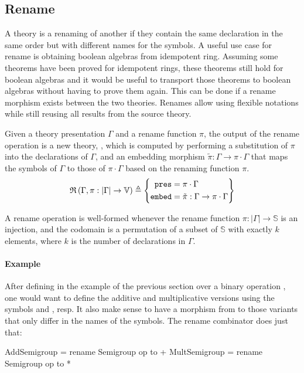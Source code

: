 \subsection{Rename}
\label{subsec:rename}
A theory is a renaming of another if they contain the same declaration in the same order but with different names for the symbols. A useful use case for rename is obtaining boolean algebras from idempotent ring. Assuming some theorems have been proved for idempotent rings, these theorems still hold for boolean algebras and it would be useful to transport those theorems to boolean algebras without having to prove them again. This can be done if a rename morphism exists between the two theories. Renames allow using flexible notations while still reusing all results from the source theory. 

Given a theory presentation $\Gamma$ and a rename function $\pi$, the output of the rename operation is a new theory, , which is computed by performing a substitution of $\pi$ into the declarations of $\Gamma$, and an embedding morphism $\tilde{\pi} : \Gamma \to \pi\cdot\Gamma$ that maps the symbols of $\Gamma$ to those of $\pi\cdot\Gamma$ based on the renaming function $\pi$. 
\[ \mathfrak{R}\left(\Gamma, \pi : \left| \Gamma \right| \rightarrow \mathbb{V}\right) \triangleq \left\{\begin{aligned} \mathtt{pres} & = \pi \cdot \Gamma \\ \mathtt{embed} & = \tilde{\pi}:\Gamma \rightarrow \pi\cdot\Gamma \end{aligned}\right\} \]

A rename operation is well-formed whenever the rename function $\pi : |\Gamma| \to \mathbb{S}$ is an injection, and the codomain is a permutation of a subset of $\mathbb{S}$ with exactly $k$ elements, where $k$ is the number of declarations in $\Gamma$. 

\paragraph{Example}
After defining  in the example of the previous section over a binary operation , one would want to define the additive and multiplicative versions using the symbols \lstmath{+} and \lstmath{*}, resp. It also make sense to have a morphism from  to those variants that only differ in the names of the symbols. The rename combinator does just that: 
\begin{togcode}
AddSemigroup  = rename Semigroup {op to +} 
MultSemigroup = rename Semigroup {op to *} 
\end{togcode}  

